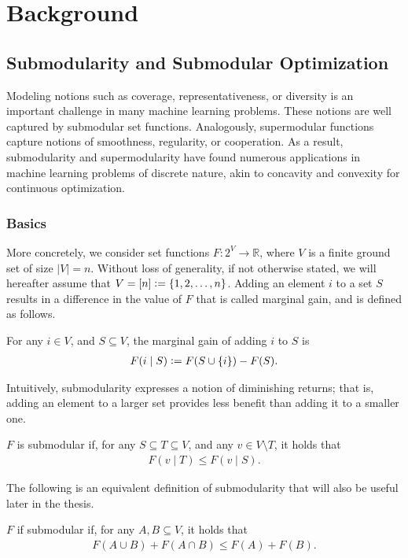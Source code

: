 \chapter{Background} \label{ch:background}

\section{Submodularity and Submodular Optimization} \label{sect:bg_submod}

Modeling notions such as coverage, representativeness, or diversity is an important challenge in many machine learning problems.
These notions are well captured by submodular set functions.
Analogously, supermodular functions capture notions of smoothness, regularity, or cooperation. 
As a result, submodularity and supermodularity have found numerous applications in machine learning problems of discrete nature, akin to concavity and convexity for continuous optimization.

\subsection{Basics}
More concretely, we consider set functions $F : 2^V \to \mathbb{R}$, where $V$ is a finite ground set of size $|V| = n$.
Without loss of generality, if not otherwise stated, we will hereafter assume that $V = [n] \vcentcolon= \{1, 2, \ldots,n\}$.
Adding an element $i$ to a set $S$ results in a difference in the value of $F$ that is called marginal gain, and is defined as follows.
\begin{definition}
For any $i \in V$, and $S \subseteq V$, the marginal gain of adding $i$ to $S$ is
\begin{align*}
F(i \mid S) \vcentcolon= F(S \cup \{i\}) - F(S).
\end{align*}
\end{definition}

Intuitively, submodularity expresses a notion of diminishing returns; that is, adding an element to a larger set provides less benefit than adding it to a smaller one.
\begin{definition}[Submodularity]
$F$ is submodular if, for any $S \subseteq T \subseteq V$, and any $v \in V \setminus T$, it holds that
\begin{align*}
F(v\mid T) \leq F(v\mid S).
\end{align*}
\end{definition}
\noindent The following is an equivalent definition of submodularity that will also be useful later in the thesis.
\begin{definition}[Submodularity] \label{def:submod}
$F$ if submodular if, for any $A, B \subseteq V$, it holds that
\begin{align*}
F(A \cup B) + F(A \cap B) \leq F(A) + F(B).
\end{align*}
\end{definition}

